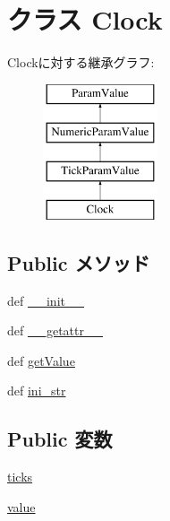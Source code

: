 \hypertarget{classm5_1_1params_1_1Clock}{
\section{クラス Clock}
\label{classm5_1_1params_1_1Clock}
}
Clockに対する継承グラフ:\begin{figure}[H]
\begin{center}
\leavevmode
\includegraphics[height=4cm]{classm5_1_1params_1_1Clock}
\end{center}
\end{figure}
\subsection*{Public メソッド}
\begin{DoxyCompactItemize}
\item 
def \hyperlink{classm5_1_1params_1_1Clock_ac775ee34451fdfa742b318538164070e}{\_\-\_\-init\_\-\_\-}
\item 
def \hyperlink{classm5_1_1params_1_1Clock_a0a990b3ec3889d40889daca9ee5e4695}{\_\-\_\-getattr\_\-\_\-}
\item 
def \hyperlink{classm5_1_1params_1_1Clock_acc340fbd4335fa34f9d57fb454b28ed0}{getValue}
\item 
def \hyperlink{classm5_1_1params_1_1Clock_a33ebe6cd32bcbd15465fc28b9d94bf82}{ini\_\-str}
\end{DoxyCompactItemize}
\subsection*{Public 変数}
\begin{DoxyCompactItemize}
\item 
\hyperlink{classm5_1_1params_1_1Clock_a278a1f181e2be02613530daeaa8afdab}{ticks}
\item 
\hyperlink{classm5_1_1params_1_1Clock_afcc7a4b78ecd8fa7e713f8cfa0f51017}{value}
\end{DoxyCompactItemize}


